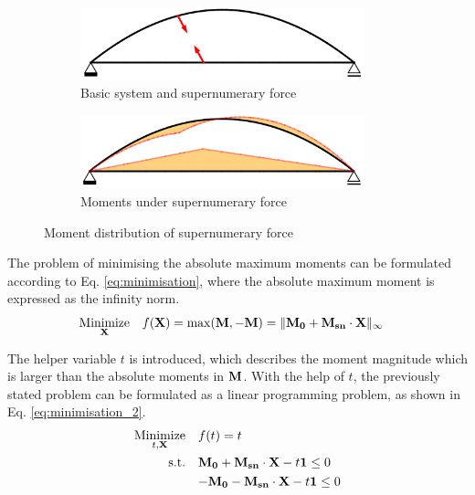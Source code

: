 \begin{figure}[H]
\centering
\begin{subfigure}{0.5\textwidth}
    \centering
    \includegraphics[trim={0 0cm 0 0},clip, width=0.9\textwidth]{overleaf/Appendix/Pictures/min_1.PNG}
    \caption{Basic system and supernumerary force}
    \label{fig:Minimisation_1}
\end{subfigure}%
\begin{subfigure}{.5\textwidth}
    \centering
    \includegraphics[trim={0 0cm 0 0},clip, width=0.9\textwidth]{overleaf/Appendix/Pictures/min_2.PNG}
    \caption{Moments under supernumerary force}
    \label{fig:Minimisation_2}
\end{subfigure}
\caption{Moment distribution of supernumerary force}
\label{fig:Minimisation}
\end{figure}

The problem of minimising the absolute maximum moments can be formulated according to Eq. \eqref{eq:minimisation}, where the absolute maximum moment is expressed as the infinity norm.
\begin{align}
    \underset{{\bf X}}{\text{Minimize}} \quad & f({\bf X}) = \max({\bf M}, -{\bf M}) = \|{\bf M_0} + {\bf M_{sn}} \cdot {\bf X}\|_{\infty} 
    \label{eq:minimisation}
\end{align}

The helper variable $t$ is introduced, which describes the moment magnitude which is larger than the absolute moments in ${\bf M}$. With the help of $t$, the previously stated problem can be formulated as a linear programming problem, as shown in Eq. \eqref{eq:minimisation_2}.
\begin{align}
    \underset{t, {\bf X}}{\text{Minimize}} \quad & f(t) = t \label{eq:minimisation_2} \\
    \text{s.t.} \quad & {\bf M_0} + {\bf M_{sn}} \cdot {\bf X} - t {\bf 1} \leq  0 \nonumber \\
    \quad & {-\bf M_0} - {\bf M_{sn}} \cdot {\bf X} - t {\bf 1} \leq 0 \nonumber
\end{align}

